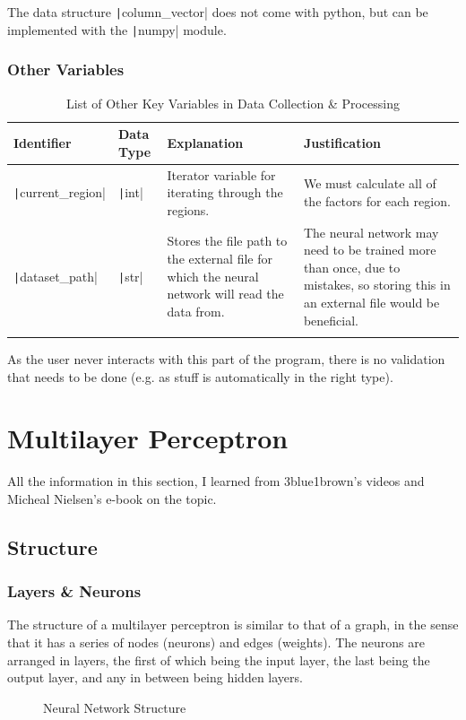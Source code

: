 \documentclass[12pt]{report}
\newcommand{\nodetext}[2]{$a^{\left(#1\right)}_#2$}
\newcommand{\pil}[1]{\protect\texttt|#1|}
\begin{document}
The data structure \pil{column_vector} does not come with python, but can be implemented with the \pil{numpy} module.

\subsubsection{Other Variables}
\begin{center}
\begin{longtable}{ | m{3cm} | m{4cm}| m{4cm} | m{4cm} |} 
    \hline
    \textbf{Identifier} & \textbf{Data Type} & \textbf{Explanation}  & \textbf{Justification} \\ 
    \hline
    \pil{current_region} & \pil{int} & Iterator variable for iterating through the regions. & We must calculate all of the factors for each region. \\ 
    \hline
    \pil{dataset_path} & \pil{str} & Stores the file path to the external file for which the neural network will read the data from. & The neural network may need to be trained more than once, due to mistakes, so storing this in an external file would be beneficial. \\ 
    \hline
\caption{List of Other Key Variables in Data Collection \& Processing}
\end{longtable}
\end{center}

As the user never interacts with this part of the program, there is no validation that needs to be done (e.g. as stuff is automatically in the right type).

\section{Multilayer Perceptron}\label{sec:mlp}
All the information in this section, I learned from 3blue1brown's videos \cite{3blue1brown} and Micheal Nielsen's e-book \cite{backpropogation} on the topic.
\subsection{Structure}\label{sec:mlpStruct}
\subsubsection{Layers \& Neurons}
The structure of a multilayer perceptron is similar to that of a graph, in the sense that it has a series of nodes (neurons) and edges (weights). The neurons are arranged in layers, the first of which being the input layer, the last being the output layer, and any in between being hidden layers.
\begin{figure}[H]
\centering
\begin{neuralnetwork}[nodespacing=15mm,layerspacing=30mm]
\inputlayer[count=5, title=Input Layer, text=\nodetext, bias=false]
\hiddenlayer[count=4, title=Hidden Layer 1, text=\nodetext, bias=false] \linklayers
\hiddenlayer[count=4, title=Hidden Layer 2, text=\nodetext, bias=false] \linklayers
\outputlayer[count=1, title=Output Layer, text=\nodetext, bias=false] \linklayers
\end{neuralnetwork}
\caption{Neural Network Structure}\label{fig:nnStructure}
\end{figure}
\end{document}
